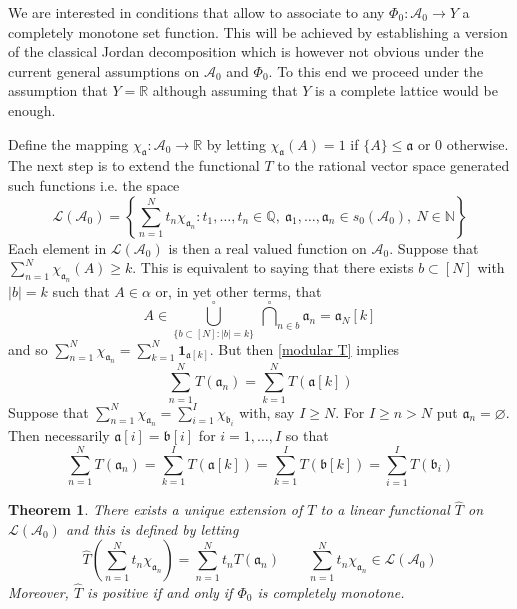 \documentclass[11pt]{amsart}
\newtheorem{theorem}{Theorem}
\theoremstyle{plain}
\begin{document}
We are interested in conditions that allow to associate to any $\Phi_0:{\mathscr{A}}_0\to Y$ 
a completely monotone set function. This will be achieved by establishing a version
of the classical Jordan decomposition which is however not obvious under the current
general assumptions on ${\mathscr{A}}_0$ and $\Phi_0$. To this end we proceed under the 
assumption that $Y={\mathbb{R}}$ although assuming that $Y$ is a complete lattice would be 
enough. 

Define the mapping $\chi_{\mathfrak a}:{\mathscr{A}}_0\to{\mathbb{R}}$ by letting $\chi_{\mathfrak a}(A)=1$ if $\{A\}\le{\mathfrak a}$ 
or $0$ otherwise. The next step is to extend the functional $T$ to the rational vector 
space generated such functions i.e. the space
\begin{equation}
\label{L(A)}
{\mathscr L({\mathscr{A}}_0)}=\left\{\sum_{n=1}^Nt_n\chi_{{\mathfrak a}_n}:
t_1,\ldots,t_n\in{\mathbb{Q}},\ {\mathfrak a}_1,\ldots,{\mathfrak a}_n\in s_0({\mathscr{A}}_0),\ N\in{\mathbb{N}}\right\}
\end{equation}
Each element in ${\mathscr L({\mathscr{A}}_0)}$ is then a real valued function on ${\mathscr{A}}_0$. Suppose
that $\sum_{n=1}^N\chi_{{\mathfrak a}_n}(A)\ge k$. This is equivalent to saying that there exists
$b\subset[N]$ with ${\vert b\vert}=k$ such that $A\in\alpha$ or,
in yet other terms, that 
\begin{equation*}
A\in\underset{\{b\subset[N]:{\vert b\vert}=k\}}{\overset\circ\bigcup}\ {\overset\circ\bigcap}_{n\in b}{\mathfrak a}_n={\mathfrak a}_N[k]
\end{equation*}
and so $\sum_{n=1}^N\chi_{{\mathfrak a}_n}=\sum_{k=1}^N{\mathbf{1}_{{{\mathfrak a}[k]}}}$. But then
\eqref{modular T} implies
\begin{equation*}
\sum_{n=1}^NT({\mathfrak a}_n)
=
\sum_{k=1}^NT\left({\mathfrak a}[k]\right)
\end{equation*}
Suppose that  $\sum_{n=1}^N\chi_{{\mathfrak a}_n}=\sum_{i=1}^I\chi_{{\mathfrak b}_i}$ with, say 
$I\ge N$. For $I\ge n>N$ put ${\mathfrak a}_n={\varnothing}$. Then necessarily ${\mathfrak a}[i]={\mathfrak b}[i]$ for 
$i=1,\ldots,I$
so that
\begin{equation}
\label{partial}
\sum_{n=1}^NT({\mathfrak a}_n)
=
\sum_{k=1}^IT\left({\mathfrak a}[k]\right)
=
\sum_{k=1}^IT\left({\mathfrak b}[k]\right)
=
\sum_{i=1}^IT({\mathfrak b}_i)
\end{equation}

\begin{theorem}
\label{th T extension}
There exists a unique extension of $T$ to a linear functional $\hat T$ on ${\mathscr L({\mathscr{A}}_0)}$ and
this is defined by letting
\begin{equation}
\label{T ext}
\hat T\left(\sum_{n=1}^Nt_n\chi_{{\mathfrak a}_n}\right)
=
\sum_{n=1}^Nt_nT({\mathfrak a}_n)
\qquad
\sum_{n=1}^Nt_n\chi_{{\mathfrak a}_n}\in{\mathscr L({\mathscr{A}}_0)}
\end{equation}
Moreover, $\hat T$ is positive if and only if $\Phi_0$ is completely monotone.
\end{theorem}
\end{document}
